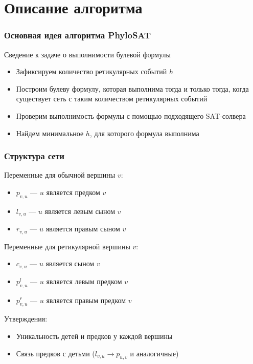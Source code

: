 \documentclass[hyperref={unicode}]{beamer}
\begin{document}
\section{Описание алгоритма}

\begin{frame}
\frametitle{Основная идея алгоритма PhyloSAT}

Сведение к задаче о выполнимости булевой формулы

\begin{itemize}
	\item Зафиксируем количество ретикулярных событий $h$
	\item Построим булеву формулу, которая выполнима тогда и только тогда, когда существует сеть с таким количеством ретикулярных событий
	\item Проверим выполнимость формулы с помощью подходящего SAT-солвера
	\item Найдем минимальное $h$, для которого формула выполнима
\end{itemize}

\end{frame}

\begin{frame}
\frametitle{Структура сети}

Переменные для обычной вершины $v$:

\begin{itemize}
	\item $p_{v, u}$ --- $u$ является предком $v$
	\item $l_{v, u}$ --- $u$ является левым сыном $v$
	\item $r_{v, u}$ --- $u$ является правым сыном $v$
\end{itemize}

Переменные для ретикулярной вершины $v$:

\begin{itemize}
	\item $c_{v, u}$ --- $u$ является сыном $v$
	\item $p^l_{v, u}$ --- $u$ является левым предком $v$
	\item $p^r_{v, u}$ --- $u$ является правым предком $v$
\end{itemize}

Утверждения:
\begin{itemize}
	\item Уникальность детей и предков у каждой вершины
	\item Связь предков с детьми ($l_{v, u} \rightarrow p_{u, v}$ и аналогичные)
\end{itemize}

\end{frame}
\end{document}
